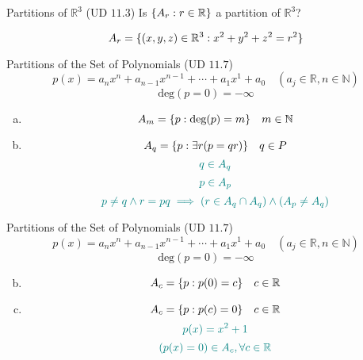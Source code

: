 \begin{frame}{}
  \begin{exampleblock}{Partitions of $\mathbb{R}^{3}$ (UD $11.3$)}
    Is $\{A_r: r \in \mathbb{R}\}$ a partition of $\mathbb{R}^{3}$?

    \[
      A_{r} = \{(x,y,z) \in \mathbb{R}^{3}: x^2 + y^2 + z^2 = r^2\}
    \]
  \end{exampleblock}

  \pause
\end{frame}

\begin{frame}{}
  \begin{exampleblock}{Partitions of the Set of Polynomials (UD $11.7$)}
    \[
      p(x) = a_n x^n + a_{n-1} x^{n-1} + \cdots + a_1 x^1 + a_0 \quad (a_j \in \mathbb{R}, n \in \mathbb{N})
    \]
    \[
      \text{deg}(p = 0) = -\infty
    \]

    \begin{enumerate}[(a)]
      \item
	\[
	  A_m = \{p: \text{deg}(p) = m\} \quad m \in \mathbb{N}
	\]
      \setcounter{enumi}{2}
      \item 
	\[
	  A_q = \{p: \exists r (p = qr)\} \quad q \in P
	\]
	\pause
	\vspace{-0.20cm}
	\[
	  \textcolor{teal}{q \in A_q}
	\]
	\vspace{-0.30cm}
	\[
	  \textcolor{teal}{p \in A_p}
	\]
	\pause
	\vspace{-0.30cm}
	\[
	  \textcolor{teal}{p \neq q \land r = pq \implies (r \in A_q \cap A_q) \land (A_p \neq A_q)}
	\]
    \end{enumerate}
  \end{exampleblock}
\end{frame}

\begin{frame}{}
  \begin{exampleblock}{Partitions of the Set of Polynomials (UD $11.7$)}
    \[
      p(x) = a_n x^n + a_{n-1} x^{n-1} + \cdots + a_1 x^1 + a_0 \quad (a_j \in \mathbb{R}, n \in \mathbb{N})
    \]
    \[
      \text{deg}(p = 0) = -\infty
    \]

    \begin{enumerate}[(a)]
      \setcounter{enumi}{1}
      \item 
	\[
	  A_c = \{p: p(0) = c\} \quad c \in \mathbb{R}
	\]
      \setcounter{enumi}{3}
      \item 
	\[
	  A_c = \{p: p(c) = 0\} \quad c \in \mathbb{R}
	\]
	\pause
	\vspace{-0.20cm}
	\[
	  \textcolor{teal}{p(x) = x^2 + 1}
	\]
	\pause
	\vspace{-0.30cm}
	\[
	  \textcolor{teal}{(p(x) = 0) \in A_c, \forall c \in \mathbb{R}}
	\]
    \end{enumerate}
  \end{exampleblock}
\end{frame}

